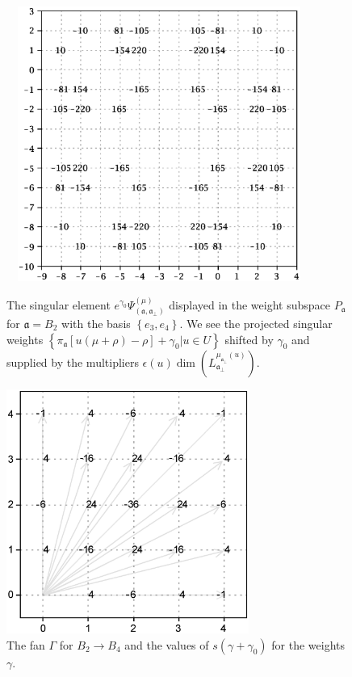 \documentclass[12pt]{iopart}
\theoremstyle{definition}
\newcommand{\af}{\mathfrak{a}}
\newcommand{\afb}{\mathfrak{a}_{\bot}}
\begin{document}
\begin{figure}[pt]
  \centering
    \includegraphics[width=100mm,height=90mm]{figure4.eps}
  \caption{The singular element $e^{\gamma_0}\Psi ^{\left( \mu \right) }_{\left(  \af, \afb \right)}$
  displayed in the weight subspace $P_{\af}$ for $\af=B_2$ with the basis $\left\{e_3,e_4\right\}$.
  We see the projected singular weights $\left\{\pi _{\af}\left[ u(\mu +\rho )-\rho \right] +\gamma_0 | u \in U \right\}$
  shifted by $\gamma_0$ and supplied by the multipliers
  $\epsilon(u)\dim\left(L_{\af_{\perp }}^{\mu_{\af_{\perp }}\left( u\right) }\right)$.}
  \label{fig:B4B2anom}

%
  \centering
  \includegraphics[height=80mm]{figure5.eps}
  \caption{The fan $\Gamma$ for $B_2\rightarrow B_4$ and the values of $s(\gamma+\gamma_0)$ for the weights $\gamma$.}
  \label{fig:B4B2Fan}
\end{figure}
\end{document}
